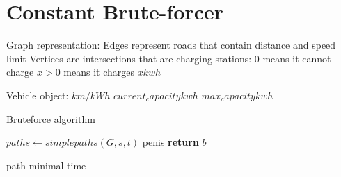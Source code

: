 \section{Constant Brute-forcer}

Graph representation:
Edges represent roads that contain distance and speed limit
Vertices are intersections that are charging stations:
$0$ means it cannot charge
$x > 0$ means it charges $x kwh$

Vehicle object:
$km/kWh$
$current_capacity kwh$
$max_capacity kwh$



\begin{algorithm}
\caption{Bruteforce algorithm}
\begin{algorithmic}[1]
	\State $paths \gets simplepaths(G,s,t)$
	\State penis
	\EndFor
\State \textbf{return} $b$
\EndProcedure
\end{algorithmic}
\end{algorithm}

\begin{algorithm}
\caption{path-minimal-time}
\end{algorithm}
















